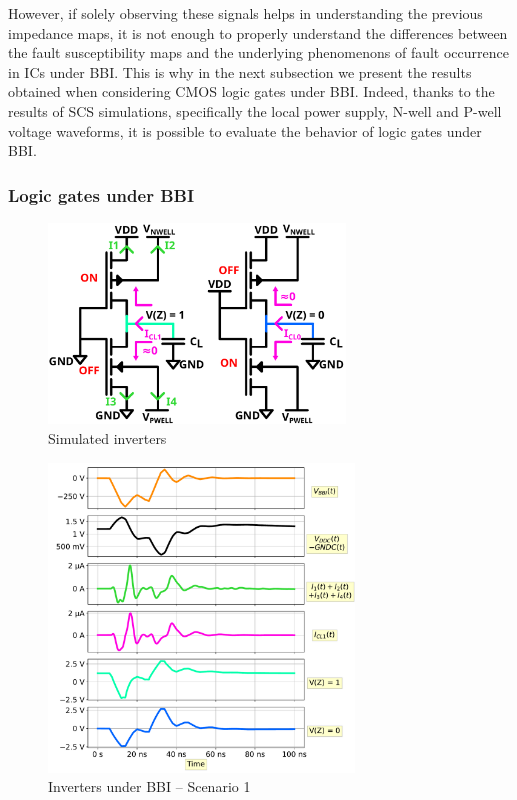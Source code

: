 \documentclass[10pt, conference, compsocconf]{IEEEtran}
\begin{document}
However, if solely observing these signals helps in understanding the previous impedance maps, it is not enough to 
properly understand the differences between the fault susceptibility maps and the underlying phenomenons of fault occurrence in ICs under BBI.
This is why in the next subsection we present the results obtained when considering CMOS logic gates under BBI.
Indeed, thanks to the results of SCS simulations, specifically the local power supply, N-well and P-well voltage waveforms, it is possible to evaluate the behavior of logic gates under BBI.

\subsubsection{Logic gates under BBI}
\label{subsubsection:Faults ivx expl}

\begin{figure}[!hbtp]
\centering
\includegraphics[width=3.1in]{ivx3New}
\caption{Simulated inverters}
\label{ivxSim}
\end{figure}

\begin{figure}[!hbtp]
\centering
\includegraphics[width=3.2in]{logic_gates_tri_M0}
\caption{Inverters under BBI – Scenario 1}
\label{simIvxM0}
\end{figure}
\end{document}

